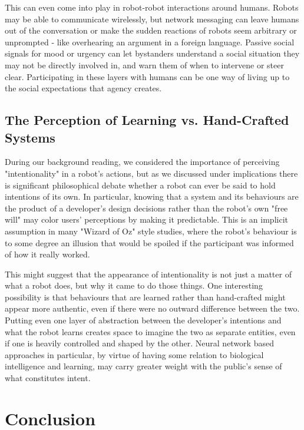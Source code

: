 \documentclass{sfuthesis}
\begin{document}
This can even come into play in robot-robot interactions around humans. Robots may be able to communicate wirelessly, but network messaging can leave humans out of the conversation or make the sudden reactions of robots seem arbitrary or unprompted - like overhearing an argument in a foreign language. Passive social signals for mood or urgency can let bystanders understand a social situation they may not be directly involved in, and warn them of when to intervene or steer clear. Participating in these layers with humans can be one way of living up to the social expectations that agency creates.

\subsection{The Perception of Learning vs. Hand-Crafted Systems}

During our background reading, we considered the importance of perceiving "intentionality" in a robot's actions, but as we discussed under implications there is significant philosophical debate whether a robot can ever be said to hold intentions of its own. In particular, knowing that a system and its behaviours are the product of a developer's design decisions rather than the robot's own "free will" may color users' perceptions by making it predictable. This is an implicit assumption in many "Wizard of Oz" style studies, where the robot's behaviour is to some degree an illusion that would be spoiled if the participant was informed of how it really worked.

This might suggest that the appearance of intentionality is not just a matter of what a robot does, but why it came to do those things. One interesting possibility is that behaviours that are learned rather than hand-crafted might appear more authentic, even if there were no outward difference between the two. Putting even one layer of abstraction between the developer's intentions and what the robot learns creates space to imagine the two as separate entities, even if one is heavily controlled and shaped by the other. Neural network based approaches in particular, by virtue of having some relation to biological intelligence and learning, may carry greater weight with the public's sense of what constitutes intent. 


\section{Conclusion}
\end{document}
